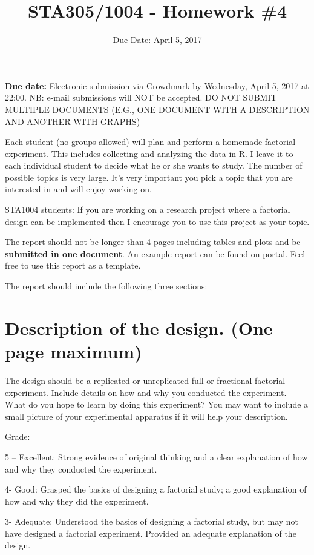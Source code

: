 \documentclass[]{article}
\title{STA305/1004 - Homework \#4}
\author{}
\date{Due Date: April 5, 2017}
\begin{document}
\maketitle

\textbf{Due date:} Electronic submission via Crowdmark by Wednesday,
April 5, 2017 at 22:00. NB: e-mail submissions will NOT be accepted. DO
NOT SUBMIT MULTIPLE DOCUMENTS (E.G., ONE DOCUMENT WITH A DESCRIPTION AND
ANOTHER WITH GRAPHS)

Each student (no groups allowed) will plan and perform a homemade
factorial experiment. This includes collecting and analyzing the data in
R. I leave it to each individual student to decide what he or she wants
to study. The number of possible topics is very large. It's very
important you pick a topic that you are interested in and will enjoy
working on.

STA1004 students: If you are working on a research project where a
factorial design can be implemented then I encourage you to use this
project as your topic.

The report should not be longer than 4 pages including tables and plots
and be \textbf{submitted in one document}. An example report can be
found on portal. Feel free to use this report as a template.

The report should include the following three sections:

\section{Description of the design. (One page
maximum)}\label{description-of-the-design.-one-page-maximum}

The design should be a replicated or unreplicated full or fractional
factorial experiment. Include details on how and why you conducted the
experiment. What do you hope to learn by doing this experiment? You may
want to include a small picture of your experimental apparatus if it
will help your description.

Grade:

5 -- Excellent: Strong evidence of original thinking and a clear
explanation of how and why they conducted the experiment.

4- Good: Grasped the basics of designing a factorial study; a good
explanation of how and why they did the experiment.

3- Adequate: Understood the basics of designing a factorial study, but
may not have designed a factorial experiment. Provided an adequate
explanation of the design.
\end{document}
